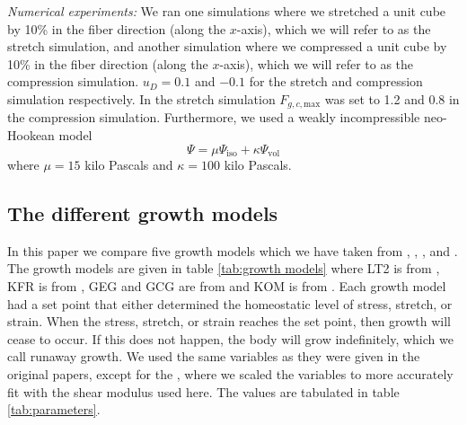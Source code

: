 \emph{Numerical experiments:} We ran one simulations where we stretched a unit cube by 10\% in the fiber direction (along the $x$-axis), which we will refer to as the stretch simulation, and another simulation where we compressed a unit cube by 10\% in the fiber direction (along the $x$-axis), which we will refer to as the compression simulation. $u_D = 0.1$ and $-0.1$ for the stretch and compression simulation respectively. In the stretch simulation $F_{g,c,\mathrm{max}}$ was set to 1.2 and 0.8 in the compression simulation. Furthermore, we used a weakly incompressible neo-Hookean model
\begin{equation*}
    \Psi = \mu\Psi_\text{iso} + \kappa\Psi_\text{vol}
\end{equation*}
where $\mu = 15$ kilo Pascals and $\kappa = 100$ kilo Pascals.
\subsection{The different growth models}
\label{sub:different models} 
In this paper we compare five growth models which we have taken from \citep{Taber1998}, \citep{Kroon2009}, \citep{Goktepe}, and \citep{Kerckhoffs2012}. The growth models are given in table \ref{tab:growth models} where LT2 is from \citep{Taber1998}, KFR is from \citep{Kroon2009}, GEG and GCG are from \citep{Goktepe} and KOM is from \citep{Kerckhoffs2012}. Each growth model had a set point that either determined the homeostatic level of stress, stretch, or strain. When the stress, stretch, or strain reaches the set point, then growth will cease to occur. If this does not happen, the body will grow indefinitely, which we call runaway growth. We used the same variables as they were given in the original papers, except for the , where we scaled the variables to more accurately fit with the shear modulus used here. The values are tabulated in table \ref{tab:parameters}.
